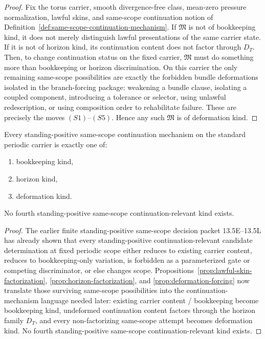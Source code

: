 \begin{proof}
Fix the torus carrier, smooth divergence-free class, mean-zero pressure normalization, lawful skins,
and same-scope continuation notion of Definition~\ref{def:same-scope-continuation-mechanism}. If
$\mathfrak M$ is not of bookkeeping kind, it does not merely distinguish lawful presentations of the
same carrier state. If it is not of horizon kind, its continuation content does not factor through
$D_T$. Then, to change continuation status on the fixed carrier, $\mathfrak M$ must do something more
than bookkeeping or horizon discrimination. On this carrier the only remaining same-scope
possibilities are exactly the forbidden bundle deformations isolated in the branch-forcing package:
weakening a bundle clause, isolating a coupled component, introducing a tolerance or selector, using
unlawful redescription, or using composition order to rehabilitate failure. These are precisely the
moves $(S1)$--$(S5)$. Hence any such $\mathfrak M$ is of deformation kind.
\end{proof}

\begin{manualtheorem}
\label{thm:carrier-exhaustive-trichotomy}
Every standing-positive same-scope continuation mechanism on the standard periodic carrier is exactly one of:
\begin{enumerate}[label=(\roman*), leftmargin=2.2em]
\item bookkeeping kind,
\item horizon kind,
\item deformation kind.
\end{enumerate}
No fourth standing-positive same-scope continuation-relevant kind exists.
\end{manualtheorem}

\begin{proof}
The earlier finite standing-positive same-scope decision packet 13.5E--13.5L has already shown that every
standing-positive continuation-relevant candidate determination at fixed periodic scope either reduces to existing carrier content,
reduces to bookkeeping-only variation, is forbidden as a parameterized gate or competing
discriminator, or else changes scope. Propositions~\ref{prop:lawful-skin-factorization},
\ref{prop:horizon-factorization}, and \ref{prop:deformation-forcing} now translate those surviving
same-scope possibilities into the continuation-mechanism language needed later: existing carrier
content / bookkeeping become bookkeeping kind, undeformed continuation content factors through the
horizon family $D_T$, and every non-factorizing same-scope attempt becomes deformation kind. No fourth
standing-positive same-scope continuation-relevant kind exists.
\end{proof}

